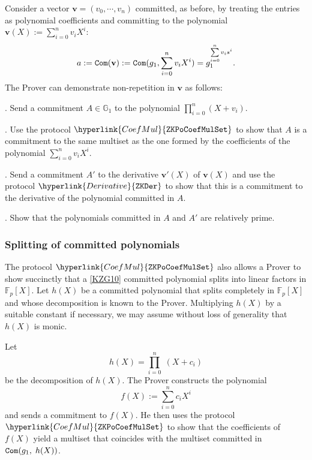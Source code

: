 \documentclass[11pt, lettersize, notitlepage, leqno, footskip=0.6cm]{article}
\newcommand{\bFp}{\mathbb{F}_p}
\newcommand{\mb}{\mathbb}
\newcommand{\mbf}{\mathbf}
\newcommand{\vs}{\vspace{-0.15cm}}
\newcommand{\noin}{\noindent}
\numberwithin{equation}{section}
\begin{document}
Consider a vector $\mbf{v} = (v_0,\cdots,v_n)$ committed, as before, by treating the entries as polynomial coefficients and committing to the polynomial $\mbf{v}(X):= \sum_{i=0}^n v_iX^i$: \vs $$ a:= {\tt{Com}}(\mbf{v}):= {\tt{Com}}(g_1,\sum\limits_{i=0}^n v_iX^i ) =  g_1^{\sum\limits_{i=0}^n v_i s^i}. $$ The Prover can demonstrate non-repetition in $\mbf{v}$ as follows: \vspace{2mm}

\noin 1. Send a commitment $A\in \mb{G}_1$ to the polynomial $\prod\limits_{i=0}^n (X+v_i)$. \vspace{1mm}

\noin 2. Use the protocol $\hyperlink{CoefMul}{\tt{ZKPoCoefMulSet}}$ to show that $A$ is a commitment to the same multiset as the one formed by the coefficients of the polynomial $\sum_{i=0}^n v_iX^i$.        \vspace{1mm}

\noin 3. Send a commitment $A'$ to the derivative $\mbf{v}'(X)$ of $\mbf{v}(X)$ and use the protocol $\hyperlink{Derivative}{\tt{ZKDer}}$ to show that this is a commitment to the derivative of the polynomial committed in $A$. \vspace{1mm}

\noin 4. Show that the polynomials committed in $A$ and $A'$ are relatively prime. \vspace{2mm}




\subsubsection{\fontsize{11}{11}\selectfont Splitting of committed polynomials}

The protocol $\hyperlink{CoefMul}{\tt{ZKPoCoefMulSet}}$ also allows a Prover to show succinctly that a \hyperlink{KZG}{[KZG10]} committed polynomial splits into linear factors in $\bFp[X]$. Let $h(X)$ be a committed polynomial that splits completely in $\bFp[X]$ and whose decomposition is known to the Prover. Multiplying $h(X)$ by a suitable constant if necessary, we may assume without loss of generality that $h(X)$ is monic.

Let \vs $$ h(X) = \prod\limits_{i=0}^n\; (X+c_i) $$ be the decomposition of $h(X)$. The Prover constructs the polynomial \vs $$f(X):= \sum\limits_{i=0}^n c_iX^i $$ and sends a commitment to $f(X)$. He then uses the protocol $\hyperlink{CoefMul}{\tt{ZKPoCoefMulSet}}$ to show that the coefficients of $f(X)$ yield a multiset that coincides with the multiset committed in ${\tt{Com}}(g_1,\;h(X))$. 
\end{document}
